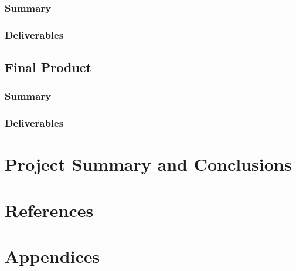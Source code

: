 \documentclass{article}
\begin{document}
\subsubsection{Summary}
\subsubsection{Deliverables}

\subsection{Final Product}
\subsubsection{Summary}
\subsubsection{Deliverables}

\newpage
\section{Project Summary and Conclusions}

\newpage
\section{References}

\newpage
\section{Appendices}
\end{document}
